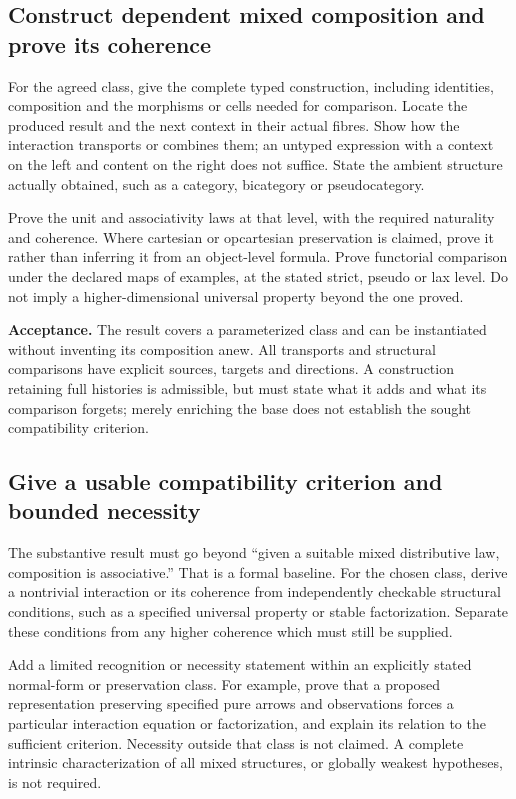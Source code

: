 \documentclass[11pt,a4paper]{article}
\begin{document}
\subsection{Construct dependent mixed composition and prove its coherence}

For the agreed class, give the complete typed construction, including identities,
composition and the morphisms or cells needed for comparison. Locate the
produced result and the next context in their actual fibres. Show how the
interaction transports or combines them; an untyped expression with a context
on the left and content on the right does not suffice. State the ambient
structure actually obtained, such as a category, bicategory or pseudocategory.

Prove the unit and associativity laws at that level, with the required
naturality and coherence. Where cartesian or opcartesian preservation is
claimed, prove it rather than inferring it from an object-level formula.
Prove functorial comparison under the declared maps of examples, at the
stated strict, pseudo or lax level. Do not imply a higher-dimensional universal
property beyond the one proved.

\textbf{Acceptance.} The result covers a parameterized class and can be
instantiated without inventing its composition anew. All transports and
structural comparisons have explicit sources, targets and directions. A
construction retaining full histories is admissible, but must state what it
adds and what its comparison forgets; merely enriching the base does not
establish the sought compatibility criterion.

\subsection{Give a usable compatibility criterion and bounded necessity}

The substantive result must go beyond ``given a suitable mixed distributive
law, composition is associative.'' That is a formal baseline. For the chosen
class, derive a nontrivial interaction or its coherence from independently
checkable structural conditions, such as a specified universal property or
stable factorization. Separate these conditions from any higher coherence
which must still be supplied.

Add a limited recognition or necessity statement within an explicitly stated
normal-form or preservation class. For example, prove that a proposed
representation preserving specified pure arrows and observations forces a
particular interaction equation or factorization, and explain its relation to
the sufficient criterion. Necessity outside that class is not claimed. A
complete intrinsic characterization of all mixed structures, or globally
weakest hypotheses, is not required.
\end{document}
